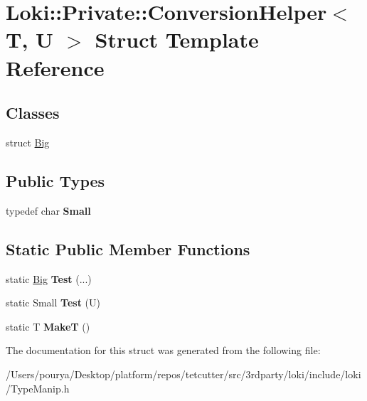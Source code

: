 \hypertarget{structLoki_1_1Private_1_1ConversionHelper}{}\section{Loki\+:\+:Private\+:\+:Conversion\+Helper$<$ T, U $>$ Struct Template Reference}
\label{structLoki_1_1Private_1_1ConversionHelper}
\subsection*{Classes}
\begin{DoxyCompactItemize}
\item 
struct \hyperlink{structLoki_1_1Private_1_1ConversionHelper_1_1Big}{Big}
\end{DoxyCompactItemize}
\subsection*{Public Types}
\begin{DoxyCompactItemize}
\item 
\hypertarget{structLoki_1_1Private_1_1ConversionHelper_a5188bdadbb0038011781cbb4f3828855}{}typedef char {\bfseries Small}\label{structLoki_1_1Private_1_1ConversionHelper_a5188bdadbb0038011781cbb4f3828855}

\end{DoxyCompactItemize}
\subsection*{Static Public Member Functions}
\begin{DoxyCompactItemize}
\item 
\hypertarget{structLoki_1_1Private_1_1ConversionHelper_a14799ff48b59a040fafe10d7eaa62822}{}static \hyperlink{structLoki_1_1Private_1_1ConversionHelper_1_1Big}{Big} {\bfseries Test} (...)\label{structLoki_1_1Private_1_1ConversionHelper_a14799ff48b59a040fafe10d7eaa62822}

\item 
\hypertarget{structLoki_1_1Private_1_1ConversionHelper_ae8cff3177e779c3a993097c0eceb941f}{}static Small {\bfseries Test} (U)\label{structLoki_1_1Private_1_1ConversionHelper_ae8cff3177e779c3a993097c0eceb941f}

\item 
\hypertarget{structLoki_1_1Private_1_1ConversionHelper_a5ee001f877f02bb7b0def90ae206bd15}{}static T {\bfseries Make\+T} ()\label{structLoki_1_1Private_1_1ConversionHelper_a5ee001f877f02bb7b0def90ae206bd15}

\end{DoxyCompactItemize}


The documentation for this struct was generated from the following file\+:\begin{DoxyCompactItemize}
\item 
/\+Users/pourya/\+Desktop/platform/repos/tetcutter/src/3rdparty/loki/include/loki/Type\+Manip.\+h\end{DoxyCompactItemize}
